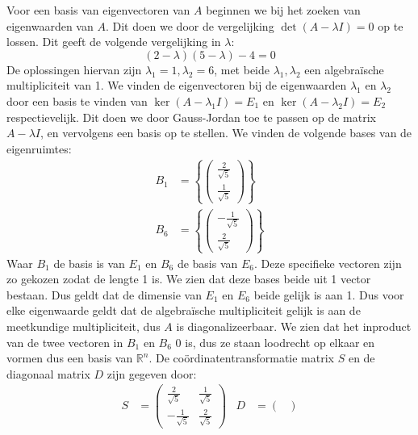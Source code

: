\documentclass[12pt, dutch, a4paper]{article}
\theoremstyle{definition}
\begin{document}
\begin{enumerate}
    Voor een basis van eigenvectoren van $A$ beginnen we bij het zoeken van eigenwaarden van $A$. Dit doen we door de vergelijking $\det(A - \lambda I) = 0$ op te lossen. Dit geeft de volgende vergelijking in $\lambda$:
    \begin{equation}
        (2 - \lambda)(5 - \lambda) -4 = 0
    \end{equation}
    De oplossingen hiervan zijn $\lambda_1 = 1, \lambda_2 = 6$, met beide $\lambda_1, \lambda_2$ een algebraïsche multipliciteit van 1. We vinden de eigenvectoren bij de eigenwaarden $\lambda_1$ en  $\lambda_2$ door een basis te vinden van $\ker (A - \lambda_1 I) = E_1$ en $\ker (A - \lambda_2 I) = E_2$ respectievelijk. Dit doen we door Gauss-Jordan toe te passen op de matrix $A - \lambda I$, en vervolgens een basis op te stellen. We vinden de volgende bases van de eigenruimtes:
    \begin{align}
        B_1 &= \left\{ 
            \begin{pmatrix}
            \frac{2}{\sqrt{5}} \\
            \frac{1}{\sqrt{5}}
            \end{pmatrix}\right\}
        \\
        B_6 &= \left\{ 
            \begin{pmatrix}
            -\frac{1}{\sqrt{5}} \\
            \frac{2}{\sqrt{5}}
            \end{pmatrix}\right\}
    \end{align}
    Waar $B_1$ de basis is van $E_1$ en $B_6$ de basis van $E_6$. Deze specifieke vectoren zijn zo gekozen zodat de lengte 1 is. We zien dat deze bases beide uit 1 vector bestaan. Dus geldt dat de dimensie van $E_1$ en $E_6$ beide gelijk is aan 1. Dus voor elke eigenwaarde geldt dat de algebraïsche multipliciteit gelijk is aan de meetkundige multipliciteit, dus $A$ is diagonalizeerbaar. We zien dat het inproduct van de twee vectoren in $B_1$ en $B_6$ 0 is, dus ze staan loodrecht op elkaar en vormen dus een basis van $\mathbb{R}^n$. De coördinatentransformatie matrix $S$ en de diagonaal matrix $D$ zijn gegeven door:
    \begin{align}
        S &= 
        \begin{pmatrix}
            \frac{2}{\sqrt{5}} & \frac{1}{\sqrt{5}} \\
            -\frac{1}{\sqrt{5}} & \frac{2}{\sqrt{5}}
        \end{pmatrix} &
        D &= 
        \begin{pmatrix}

\end{pmatrix}
\end{align}
\end{enumerate}
\end{document}
